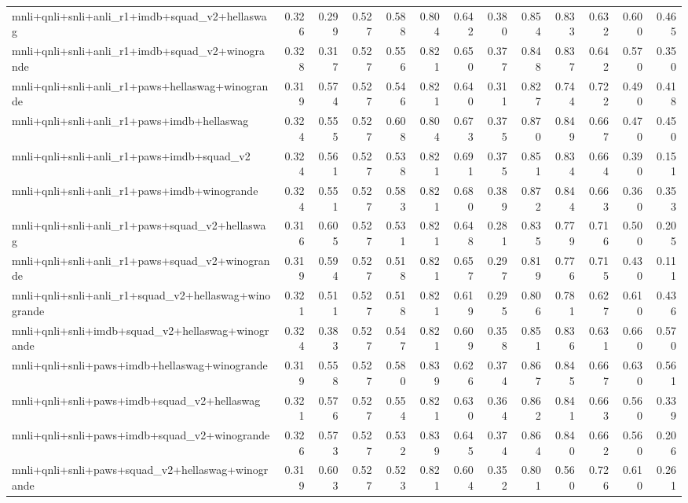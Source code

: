 \begin{table}[t]
\begin{tabular}{lrrrrrrrrrrrr}
    mnli+qnli+snli+anli\_r1+imdb+squad\_v2+hellaswag & 0.326 & 0.299 & 0.527 & 0.588 & 0.804 & 0.642 & 0.380 & 0.854 & 0.833 & 0.632 & 0.600 & 0.465 \\
    mnli+qnli+snli+anli\_r1+imdb+squad\_v2+winogrande & 0.328 & 0.317 & 0.527 & 0.556 & 0.821 & 0.650 & 0.377 & 0.848 & 0.837 & 0.642 & 0.570 & 0.350 \\
    mnli+qnli+snli+anli\_r1+paws+hellaswag+winogrande & 0.319 & 0.574 & 0.527 & 0.546 & 0.821 & 0.640 & 0.311 & 0.827 & 0.744 & 0.722 & 0.490 & 0.418 \\
    mnli+qnli+snli+anli\_r1+paws+imdb+hellaswag & 0.324 & 0.555 & 0.527 & 0.608 & 0.804 & 0.673 & 0.375 & 0.870 & 0.849 & 0.667 & 0.470 & 0.450 \\
    mnli+qnli+snli+anli\_r1+paws+imdb+squad\_v2 & 0.324 & 0.561 & 0.527 & 0.538 & 0.821 & 0.691 & 0.375 & 0.851 & 0.834 & 0.664 & 0.390 & 0.151 \\
    mnli+qnli+snli+anli\_r1+paws+imdb+winogrande & 0.324 & 0.551 & 0.527 & 0.583 & 0.821 & 0.680 & 0.389 & 0.872 & 0.844 & 0.663 & 0.360 & 0.353 \\
    mnli+qnli+snli+anli\_r1+paws+squad\_v2+hellaswag & 0.316 & 0.605 & 0.527 & 0.531 & 0.821 & 0.648 & 0.281 & 0.835 & 0.779 & 0.716 & 0.500 & 0.205 \\
    mnli+qnli+snli+anli\_r1+paws+squad\_v2+winogrande & 0.319 & 0.594 & 0.527 & 0.518 & 0.821 & 0.657 & 0.297 & 0.819 & 0.776 & 0.715 & 0.430 & 0.111 \\
    mnli+qnli+snli+anli\_r1+squad\_v2+hellaswag+winogrande & 0.321 & 0.511 & 0.527 & 0.518 & 0.821 & 0.619 & 0.295 & 0.806 & 0.781 & 0.627 & 0.610 & 0.436 \\
    mnli+qnli+snli+imdb+squad\_v2+hellaswag+winogrande & 0.324 & 0.383 & 0.527 & 0.547 & 0.821 & 0.609 & 0.358 & 0.851 & 0.836 & 0.631 & 0.660 & 0.570 \\
    mnli+qnli+snli+paws+imdb+hellaswag+winogrande & 0.319 & 0.558 & 0.527 & 0.580 & 0.839 & 0.626 & 0.374 & 0.867 & 0.845 & 0.667 & 0.630 & 0.561 \\
    mnli+qnli+snli+paws+imdb+squad\_v2+hellaswag & 0.321 & 0.576 & 0.527 & 0.554 & 0.821 & 0.630 & 0.364 & 0.862 & 0.841 & 0.663 & 0.560 & 0.339 \\
    mnli+qnli+snli+paws+imdb+squad\_v2+winogrande & 0.326 & 0.573 & 0.527 & 0.532 & 0.839 & 0.645 & 0.374 & 0.864 & 0.840 & 0.662 & 0.560 & 0.206 \\
    mnli+qnli+snli+paws+squad\_v2+hellaswag+winogrande & 0.319 & 0.603 & 0.527 & 0.523 & 0.821 & 0.604 & 0.352 & 0.801 & 0.560 & 0.726 & 0.610 & 0.261 \\

\end{tabular}
\end{table}
